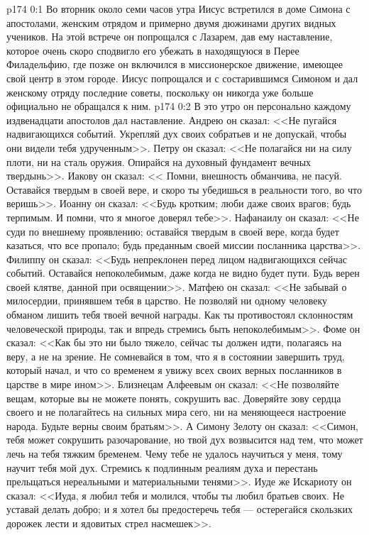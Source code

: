 \vs p174 0:1 Во вторник около семи часов утра Иисус встретился в доме Симона с апостолами, женским отрядом и примерно двумя дюжинами других видных учеников. На этой встрече он попрощался с Лазарем, дав ему наставление, которое очень скоро сподвигло его убежать в находящуюся в Перее Филадельфию, где позже он включился в миссионерское движение, имеющее свой центр в этом городе. Иисус попрощался и с состарившимся Симоном и дал женскому отряду последние советы, поскольку он никогда уже больше официально не обращался к ним.
\vs p174 0:2 В это утро он персонально каждому издвенадцати апостолов дал наставление. Андрею он сказал: <<Не пугайся надвигающихся событий. Укрепляй дух своих собратьев и не допускай, чтобы они видели тебя удрученным>>. Петру он сказал: <<Не полагайся ни на силу плоти, ни на сталь оружия. Опирайся на духовный фундамент вечных твердынь>>. Иакову он сказал: << Помни, внешность обманчива, не пасуй. Оставайся твердым в своей вере, и скоро ты убедишься в реальности того, во что веришь>>. Иоанну он сказал: <<Будь кротким; люби даже своих врагов; будь терпимым. И помни, что я многое доверял тебе>>. Нафанаилу он сказал: <<Не суди по внешнему проявлению; оставайся твердым в своей вере, когда будет казаться, что все пропало; будь преданным своей миссии посланника царства>>. Филиппу он сказал: <<Будь непреклонен перед лицом надвигающихся сейчас событий. Оставайся непоколебимым, даже когда не видно будет пути. Будь верен своей клятве, данной при освящении>>. Матфею он сказал: <<Не забывай о милосердии, принявшем тебя в царство. Не позволяй ни одному человеку обманом лишить тебя твоей вечной награды. Как ты противостоял склонностям человеческой природы, так и впредь стремись быть непоколебимым>>. Фоме он сказал: <<Как бы это ни было тяжело, сейчас ты должен идти, полагаясь на веру, а не на зрение. Не сомневайся в том, что я в состоянии завершить труд, который начал, и что со временем я увижу всех своих верных посланников в царстве в мире ином>>. Близнецам Алфеевым он сказал: <<Не позволяйте вещам, которые вы не можете понять, сокрушить вас. Доверяйте зову сердца своего и не полагайтесь на сильных мира сего, ни на меняющееся настроение народа. Будьте верны своим братьям>>. А Симону Зелоту он сказал: <<Симон, тебя может сокрушить разочарование, но твой дух возвысится над тем, что может лечь на тебя тяжким бременем. Чему тебе не удалось научиться у меня, тому научит тебя мой дух. Стремись к подлинным реалиям духа и перестань прельщаться нереальными и материальными тенями>>. Иуде же Искариоту он сказал: <<Иуда, я любил тебя и молился, чтобы ты любил братьев своих. Не уставай делать добро; и я хотел бы предостеречь тебя --- остерегайся скользких дорожек лести и ядовитых стрел насмешек>>.
